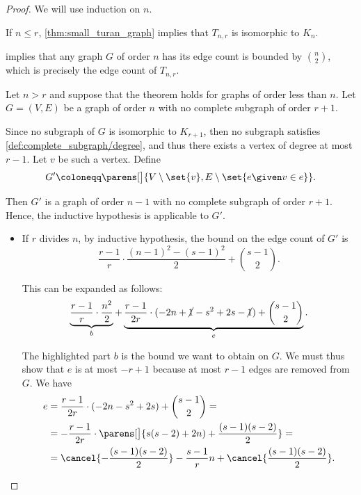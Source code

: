 \begin{proof}
  We will use induction on \( n \).

   If \( n \leq r \), \cref{thm:small_turan_graph} implies that \( T_{n,r} \) is isomorphic to \( K_n \).

   implies that any graph \( G \) of order \( n \) has its edge count is bounded by \( \binom n 2 \), which is precisely the edge count of \( T_{n,r} \).

   Let \( n > r \) and suppose that the theorem holds for graphs of order less than \( n \). Let \( G = (V, E) \) be a graph of order \( n \) with no complete subgraph of order \( r + 1 \).

  Since no subgraph of \( G \) is isomorphic to \( K_{r+1} \), then no subgraph satisfies \cref{def:complete_subgraph/degree}, and thus there exists a vertex of degree at most \( r - 1 \). Let \( v \) be such a vertex. Define
  \begin{equation*}
    G' \coloneqq \parens[\big]{ V \setminus \set{ v }, E \setminus \set{ e \given v \in e } }.
  \end{equation*}

  Then \( G' \) is a graph of order \( n - 1 \) with no complete subgraph of order \( r + 1 \). Hence, the inductive hypothesis is applicable to \( G' \).
  \begin{itemize}
    \item If \( r \) divides \( n \), by inductive hypothesis, the bound on the edge count of \( G' \) is
    \begin{equation*}
      \frac {r - 1} r \cdot \frac {(n - 1)^2 - (s - 1)^2} 2 + \binom {s - 1} 2.
    \end{equation*}

    This can be expanded as follows:
    \begin{equation*}
      \underbrace{\frac {r - 1} r \cdot \frac {n^2} 2}_b + \underbrace{\frac {r - 1} {2r} \cdot (-2n + \cancel{1} - s^2 + 2s - \cancel{1}) + \binom {s - 1} 2}_e.
    \end{equation*}

    The highlighted part \( b \) is the bound we want to obtain on \( G \). We must thus show that \( e \) is at most \( -r + 1 \) because at most \( r - 1 \) edges are removed from \( G \). We have
    \begin{align*}
      e
      &=
      \frac {r - 1} {2r} \cdot (-2n - s^2 + 2s) + \binom {s - 1} 2
      = \\ &=
      -\frac {r - 1} {2r} \cdot \parens[\big]{ s(s - 2) + 2n ) + \frac {(s - 1)(s - 2)} 2 }
      = \\ &=
      \cancel{-\frac {(s - 1)(s - 2)} 2} - \frac {s - 1} r n + \cancel{\frac {(s - 1)(s - 2)} 2}.
    \end{align*}


\end{itemize}
\end{proof}
